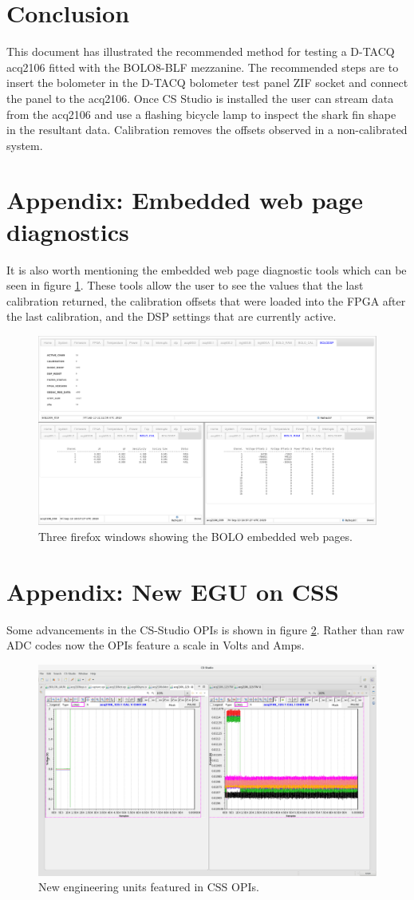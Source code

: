 \documentclass{article}
\begin{document}
\newpage
\section{Conclusion}
This document has illustrated the recommended method for testing a \mbox{D-TACQ} acq2106 fitted with the BOLO8-BLF mezzanine.
The recommended steps are to insert the bolometer in the \mbox{D-TACQ} bolometer test panel ZIF socket and connect the panel to the acq2106.
Once CS Studio is installed the user can stream data from the acq2106 and use a flashing bicycle lamp to inspect the shark fin shape in the resultant data. Calibration removes the offsets observed in a non-calibrated system. 

\section{Appendix: Embedded web page diagnostics}
It is also worth mentioning the embedded web page diagnostic tools which can be seen in figure \ref{bolopages}.
These tools allow the user to see the values that the last calibration returned, the calibration offsets that were loaded into the FPGA after the last calibration, and the DSP settings that are currently active.

\begin{figure} [hbt!]
	\centering
	\includegraphics[width=5.0in]{images/bolo-pages.png}
	\caption{Three firefox windows showing the BOLO embedded web pages.}
	\label{bolopages}
\end{figure}

\section{Appendix: New EGU on CSS}
Some advancements in the CS-Studio OPIs is shown in figure \ref{boloegu}.
Rather than raw ADC codes now the OPIs feature a scale in Volts and Amps.

\begin{figure} [hbt!]
	\centering
	\includegraphics[width=5.0in]{images/css_egu.png}
	\caption{New engineering units featured in CSS OPIs.}
	\label{boloegu}
\end{figure}
\end{document}
